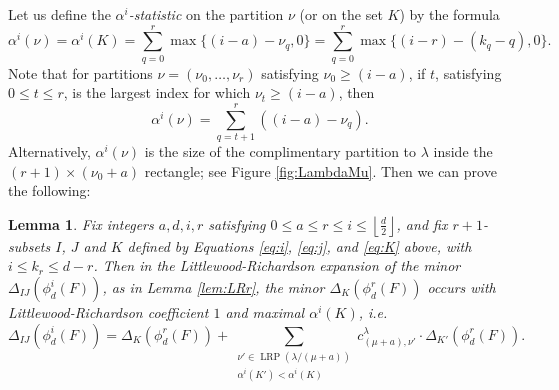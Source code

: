 \documentclass[unnumsec,webpdf,modern,medium]{oup-authoring-template}
\newcommand{\flo}[1]{\left\lfloor\frac{#1}{2}\right\rfloor}
\theoremstyle{theorem}
\newtheorem{lemma}[theorem]{Lemma}
\theoremstyle{definition}
\begin{document}
Let us define the \emph{$\alpha^i$-statistic} on the partition $\nu$ (or on the set $K$) by the formula
\begin{equation}
	\label{eq:alpha}
	\alpha^i(\nu)=\alpha^i(K)=\sum_{q=0}^r\max\{(i-a)-\nu_q,0\}=\sum_{q=0}^r\max\{(i-r)-(k_q-q),0\}.
\end{equation}
Note that for partitions $\nu=(\nu_0,\ldots,\nu_r)$ satisfying $\nu_0\geq (i-a)$, if $t$, satisfying $0\leq t\leq r$, is the largest index for which $\nu_t\geq (i-a)$, then 
\begin{equation}
	\label{eq:alpha2}
	\alpha^i(\nu)=\sum_{q=t+1}^r\left((i-a)-\nu_q\right).
\end{equation}
Alternatively, $\alpha^i(\nu)$ is the size of the complimentary partition to $\lambda$ inside the $(r+1)\times (\nu_0+a)$ rectangle; see Figure \ref{fig:LambdaMu}.
Then we can prove the following:
\begin{lemma}
	\label{lem:alpha}
	Fix integers $a,d,i,r$ satisfying $0\leq a\leq r\leq i\leq \flo{d}$, and fix $r+1$-subsets $I$, $J$ and $K$ defined by Equations \eqref{eq:i}, \eqref{eq:j}, and \eqref{eq:K} above, with $i\leq k_r\leq d-r$.  Then in the Littlewood-Richardson expansion of the minor $\Delta_{IJ}(\phi^i_d(F))$, as in Lemma \ref{lem:LRr}, the minor $\Delta_K(\phi^r_d(F))$ occurs with Littlewood-Richardson coefficient $1$ and maximal $\alpha^i(K)$, i.e.
	$$\Delta_{IJ}\left(\phi^i_d(F)\right)=\Delta_K\left(\phi^r_d(F)\right)+\sum_{\substack{\nu'\in\operatorname{LRP}(\lambda/(\mu+a))\\ \alpha^i(K')<\alpha^i(K)\\}}c^\lambda_{(\mu+a),\nu'}\cdot \Delta_{K'}\left(\phi^r_d(F)\right).$$
\end{lemma}
\end{document}
